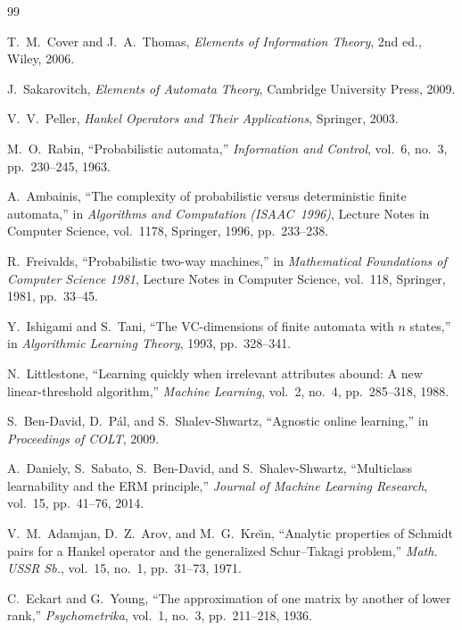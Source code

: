 \documentclass[12pt]{article}
\theoremstyle{definition}
\begin{document}
\begin{thebibliography}{99}

T.~M.~Cover and J.~A.~Thomas,
\emph{Elements of Information Theory}, 2nd ed.,
Wiley, 2006.

J.~Sakarovitch,
\emph{Elements of Automata Theory},
Cambridge University Press, 2009.

V.~V.~Peller,
\emph{Hankel Operators and Their Applications},
Springer, 2003.

M.~O.~Rabin,
``Probabilistic automata,''
\emph{Information and Control}, vol.~6, no.~3, pp.~230--245, 1963.

A.~Ambainis,
``The complexity of probabilistic versus deterministic finite automata,''
in \emph{Algorithms and Computation (ISAAC~1996)},
Lecture Notes in Computer Science, vol.~1178,
Springer, 1996, pp.~233--238.

R.~Freivalds,
``Probabilistic two-way machines,''
in \emph{Mathematical Foundations of Computer Science 1981},
Lecture Notes in Computer Science, vol.~118,
Springer, 1981, pp.~33--45.

Y.~Ishigami and S.~Tani,
``The VC-dimensions of finite automata with $n$ states,''
in \emph{Algorithmic Learning Theory},
1993, pp.~328--341.

N.~Littlestone,
``Learning quickly when irrelevant attributes abound: A new linear-threshold
algorithm,''
\emph{Machine Learning}, vol.~2, no.~4, pp.~285--318, 1988.

S.~Ben-David, D.~P\'al, and S.~Shalev-Shwartz,
``Agnostic online learning,''
in \emph{Proceedings of COLT}, 2009.

A.~Daniely, S.~Sabato, S.~Ben-David, and S.~Shalev-Shwartz,
``Multiclass learnability and the ERM principle,''
\emph{Journal of Machine Learning Research},
vol.~15, pp.~41--76, 2014.

V.~M.~Adamjan, D.~Z.~Arov, and M.~G.~Kre\u{\i}n,
``Analytic properties of Schmidt pairs for a Hankel operator and the
generalized Schur--Takagi problem,''
\emph{Math. USSR Sb.}, vol.~15, no.~1, pp.~31--73, 1971.

C.~Eckart and G.~Young,
``The approximation of one matrix by another of lower rank,''
\emph{Psychometrika}, vol.~1, no.~3, pp.~211--218, 1936.


\end{thebibliography}
\end{document}

